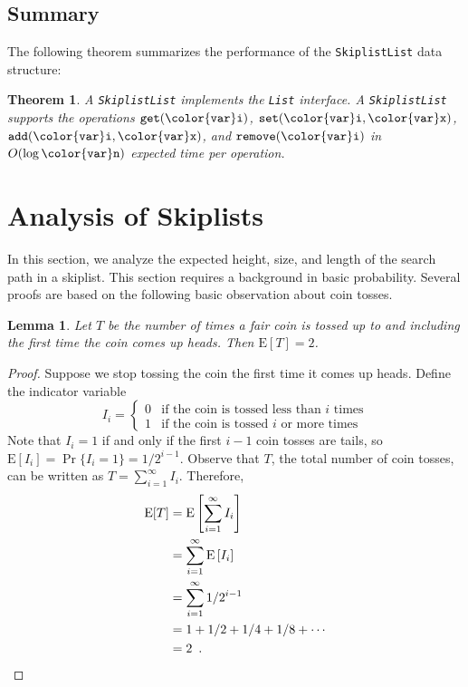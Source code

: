 \documentclass[10pt]{book}
\newcommand{\seclabel}[1]{\label{sec:#1}}
\theoremstyle{plain}
\newtheorem{thm}{Theorem}[chapter]
\newcommand{\thmlabel}[1]{\label{thm:#1}}
\newtheorem{lem}{Lemma}[chapter]
\newcommand{\lemlabel}[1]{\label{lem:#1}}
\theoremstyle{definition}
\newcommand{\E}{\mathrm{E}}
\begin{document}
\subsection{Summary}

The following theorem summarizes the performance of the \texttt{SkiplistList}
data structure:

\begin{thm}\thmlabel{skiplistlist}
  A \texttt{SkiplistList} implements the \texttt{List} interface.  A \texttt{SkiplistList}
  supports the operations \ensuremath{\mathtt{get({\color{var}i})}}, \ensuremath{\mathtt{set({\color{var}i},{\color{var}x})}}, \ensuremath{\mathtt{add({\color{var}i},{\color{var}x})}}, and
  \ensuremath{\mathtt{remove({\color{var}i})}} in $O(\log \ensuremath{\mathtt{{\color{var}n}}})$ expected time per operation.
\end{thm}


\section{Analysis of Skiplists}
\seclabel{skiplist-analysis}

In this section, we analyze the expected height, size, and length of
the search path in a skiplist.  This section requires a background in
basic probability.  Several proofs are based on the following basic
observation about coin tosses.


\begin{lem}\lemlabel{coin-tosses}
  Let $T$ be the number of times a fair coin is tossed up to and including
  the first time the coin comes up heads.  Then $\E[T]=2$.
\end{lem}

\begin{proof}
  Suppose we stop tossing the coin the first time it comes up
  heads. Define the indicator variable
  \[ I_{i} = \left\{\begin{array}{ll}
     0 & \mbox{if the coin is tossed less than $i$ times} \\
     1 & \mbox{if the coin is tossed $i$ or more times} 
     \end{array}\right.
  \]
  Note that $I_i=1$ if and only if the first $i-1$ coin tosses are tails,
  so $\E[I_i]=\Pr\{I_i=1\}=1/2^{i-1}$.  Observe that $T$, the total
  number of coin tosses, can be written as $T=\sum_{i=1}^{\infty} I_i$.
  Therefore,
  \begin{align*}
    \E[T] & =  \E\left[\sum_{i=1}^\infty I_i\right] \\
     & =  \sum_{i=1}^\infty \E\left[I_i\right] \\
     & =  \sum_{i=1}^\infty 1/2^{i-1} \\
     & =  1 + 1/2 + 1/4 + 1/8 + \cdots \\
     & =  2 \enspace .   \qedhere
  \end{align*} 
\end{proof}
\end{document}
